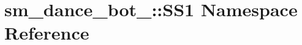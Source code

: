 \hypertarget{namespacesm__dance__bot__2_1_1SS1}{}\section{sm\+\_\+dance\+\_\+bot\+\_\+:\+:S\+S1 Namespace Reference}
\label{namespacesm__dance__bot__2_1_1SS1}
